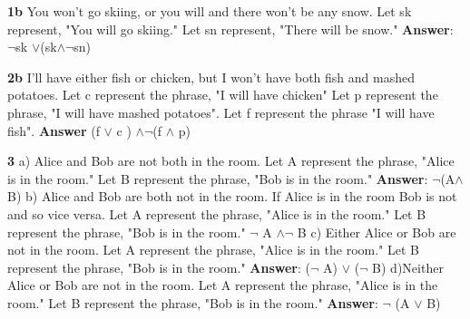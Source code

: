 \documentclass[12pt]{article}
\begin{document}
\textbf{1b} You won't go skiing, or you will and there won't be any snow. \newline
Let sk represent, "You will go skiing." \newline
Let sn represent, "There will be snow." \newline 
\textbf{Answer}: $\neg$sk $\vee$(sk$\wedge \neg$sn) \newline 
\vspace{0.5cm}

\textbf{2b}  I'll have either fish or chicken, but I won't have both fish and mashed potatoes. \newline 
Let c represent the phrase, "I will have chicken" \newline 
Let p represent the phrase, "I will have mashed potatoes". \newline
Let f represent the phrase "I will have fish". \newline
\textbf{Answer} (f $\vee$ c ) $\wedge \neg$(f $\wedge$ p) \newline

\textbf{3}
a) Alice and Bob are not both in the room. \newline
Let A represent the phrase,  "Alice is in the room." \newline
Let B represent the phrase, "Bob is in the room." \newline
\textbf{Answer}: $\neg$(A$\wedge$ B) \newline
b) Alice and Bob are both not in the room. \newline 
If Alice is in the room Bob is not and so vice versa.\newline 
Let A represent the phrase,  "Alice is in the room." \newline
Let B represent the phrase, "Bob is in the room." \newline
$\neg$ A $\wedge \neg$ B \newline
c) Either Alice or Bob are not in the room. \newline 
Let A represent the phrase,  "Alice is in the room." \newline
Let B represent the phrase, "Bob is in the room." \newline
\textbf{Answer}: ($\neg$ A) $\vee$ ($\neg$ B) \newline 
d)Neither Alice or Bob are not in the room. \newline
Let A represent the phrase,  "Alice is in the room." \newline
Let B represent the phrase, "Bob is in the room." \newline
\textbf{Answer}: $\neg$ (A $\vee$ B) \newline 
\vspace{0.5cm} 
\end{document}
